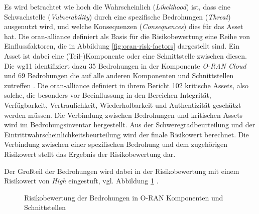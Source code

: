 \par Es wird betrachtet wie hoch die Wahrscheinlich (\textit{Likelihood}) ist, dass eine Schwachstelle (\textit{Vulnerability}) durch eine spezifische Bedrohungen (\textit{Threat}) ausgenutzt wird, und welche Konsequenzen (\textit{Consequences}) dies für das Asset hat. Die \gls{oran-alliance} definiert als Basis für die Risikobewertung eine Reihe von Einflussfaktoren, die in Abbildung \ref{fig:oran-risk-factors} dargestellt sind. Ein Asset ist dabei eine (Teil-)Komponente oder eine Schnittstelle zwischen diesen.  Die \gls{wg11} identifiziert dazu 35 Bedrohungen in der Komponente \textit{O-RAN Cloud} und 69 Bedrohungen die auf alle anderen Komponenten und Schnittstellen zutreffen \autocite[Seite 31 - 69]{o-ranworkgroup11securityworkgroupORANSecurityThreat2024}. Die \gls{oran-alliance} definiert in ihrem Bericht 102 kritische Assets, also solche, die besonders vor Beeinflussung in den Bereichen Integrität, Verfügbarkeit, Vertraulichkeit, Wiederholbarkeit und Authentizität geschützt werden müssen. Die Verbindung zwischen Bedrohungen und kritischen Assets wird im Bedrohungsinventar hergestellt. Aus der Schweregradbeurteilung und der Eintrittwahrscheinlichkeitsbeurteilung wird der finale Risikowert berechnet. Die Verbindung zwischen einer spezifischen Bedrohung und dem zugehörigen Risikowert stellt das Ergebnis der Risikobewertung dar.
\par Der Großteil der Bedrohungen wird dabei in der Risikobewertung mit einem Risikowert von \textit{High} eingestuft, vgl. Abbildung \ref{fig:riskscore-oran-components} \autocite[Seite 130 - 164]{o-ranworkgroup11securityworkgroupORANSecurityThreat2024}.
%
\begin{figure}[H]
    \centering
    \label{fig:riskscore-oran-components}
    \caption{Risikobewertung der Bedrohungen in O-RAN Komponenten und Schnittstellen}
\end{figure}
%

